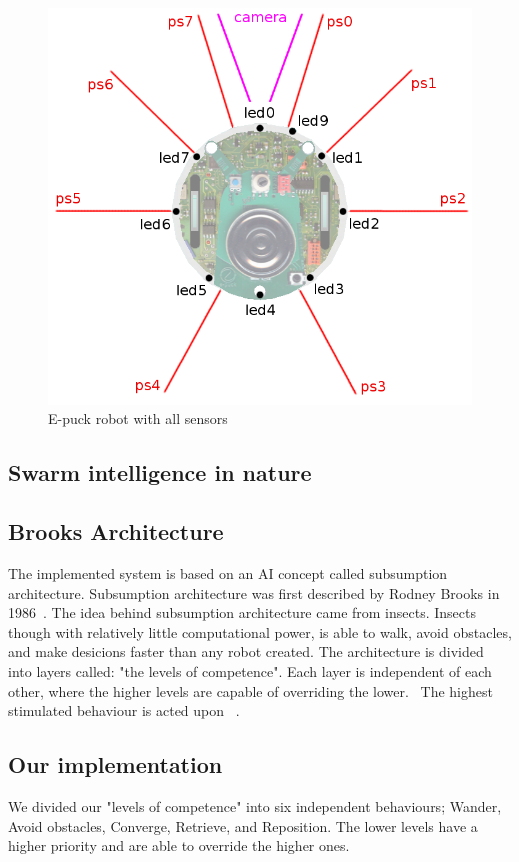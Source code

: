 \documentclass[a4paper]{article}
\begin{document}
\begin{figure}[H]
\centering
\includegraphics[scale=0.2]{e-puck_sensors_and_leds.png}
\caption{E-puck robot with all sensors}
\end{figure}

\subsection{Swarm intelligence in nature}

\subsection{Brooks Architecture}
The implemented system is based on an AI concept called subsumption architecture.
Subsumption architecture was first described by Rodney Brooks in 1986~\cite{brooks}.
The idea behind subsumption architecture came from insects.
Insects though with relatively little computational power, is able to walk, avoid obstacles, and make desicions faster than any robot created.
The architecture is divided into layers called: "the levels of competence".
Each layer is  independent of each other, where the higher levels are capable of overriding the lower.~\cite{mwarnerwu}
The highest stimulated behaviour is acted upon ~\cite{berg-karud}.

\subsection{Our implementation}
We divided our "levels of competence" into six independent behaviours; Wander, Avoid obstacles, Converge, Retrieve, and Reposition.
The lower levels have a higher priority and are able to override the higher ones.

\end{document}
